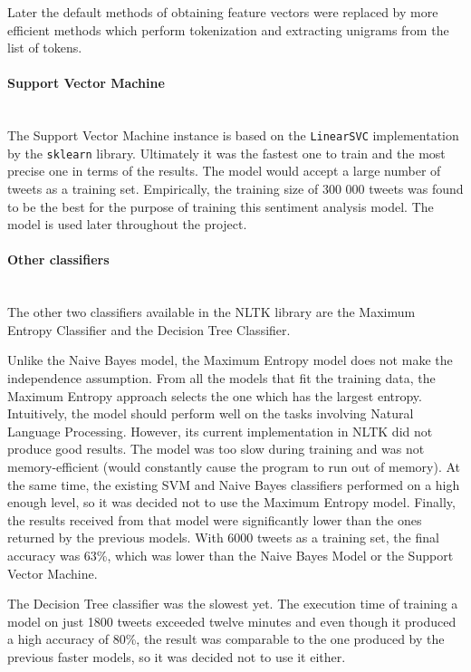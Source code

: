 Later the default methods of obtaining feature vectors were replaced by more efficient methods which perform tokenization and extracting unigrams from the list of tokens.

\paragraph{Support Vector Machine}\mbox{}\\
The Support Vector Machine instance is based on the \texttt{LinearSVC} implementation by the \texttt{sklearn} library. 
Ultimately it was the fastest one to train and the most precise one in terms of the results. The model would accept a large number of tweets as a training set. Empirically, the training size of 300 000 tweets was found to be the best for the purpose of training this sentiment analysis model. The model is used later throughout the project.

\paragraph{Other classifiers}\mbox{}\\
The other two classifiers available in the NLTK library are the Maximum Entropy Classifier and the Decision Tree Classifier.

Unlike the Naive Bayes model, the Maximum Entropy model does not make the independence assumption. From all the models that fit the training data, the Maximum Entropy approach selects the one which has the largest entropy. Intuitively, the model should perform well on the tasks involving Natural Language Processing. However, its current implementation in NLTK did not produce good results. The model was too slow during training and was not memory-efficient (would constantly cause the program to run out of memory). At the same time, the existing SVM and Naive Bayes classifiers performed on a high enough level, so it was decided not to use the Maximum Entropy model. Finally, the results received from that model were significantly lower than the ones returned by the previous models. With 6000 tweets as a training set, the final accuracy was 63\%, which was lower than the Naive Bayes Model or the Support Vector Machine. 

The Decision Tree classifier was the slowest yet. The execution time of training a model on just 1800 tweets exceeded twelve minutes and even though it produced a high accuracy of 80\%, the result was comparable to the one produced by the previous faster models, so it was decided not to use it either.

